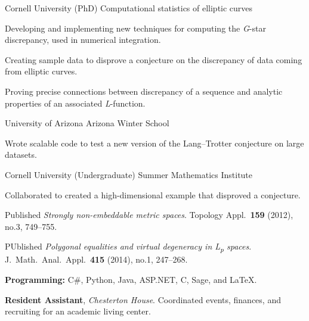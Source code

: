 \documentclass[11pt, letterpaper]{awesome-cv}
\begin{document}

\begin{cventries}

\cventry
	{Cornell University (PhD)}
	{Computational statistics of elliptic curves}
	{}
	{}
	{
		\begin{cvitems}
			\item{Developing and implementing new techniques for computing the \emph{G}-star discrepancy, used in numerical integration.}
			\item{Creating sample data to disprove a conjecture on the discrepancy of data coming from elliptic curves.}
			\item{Proving precise connections between discrepancy of a sequence and analytic properties of an associated \emph{L}-function.}
		\end{cvitems}
	}
		
\cventry
	{University of Arizona}
	{Arizona Winter School}
	{}
	{}
	{
		\begin{cvitems}
			\item{Wrote scalable code to test a new version of the Lang--Trotter conjecture on large datasets.}
		\end{cvitems}
	}
	
\cventry
	{Cornell University (Undergraduate)}
	{Summer Mathematics Institute}
	{}
	{}
	{
		\begin{cvitems}
			\item{Collaborated to created a high-dimensional example that disproved a conjecture.}
			\item{Published \emph{Strongly non-embeddable metric spaces}. Topology Appl.~\textbf{159} (2012), no.3, 749--755.}
			\item{PUblished \emph{Polygonal equalities and virtual degeneracy in L\textsubscript{p} spaces}. J.~Math.~Anal.~Appl.~\textbf{415} (2014), no.1, 247--268.}
		\end{cvitems}
	}
	
\end{cventries}






\begin{cvparagraph}

\textbf{Programming:} C\#, Python, Java, ASP.NET, C, Sage, and \LaTeX.
\end{cvparagraph}






\begin{cvparagraph}

\textbf{Resident Assistant}, \emph{Chesterton House}. Coordinated events, finances, and recruiting for an academic living center.
\end{cvparagraph}
\end{document}
